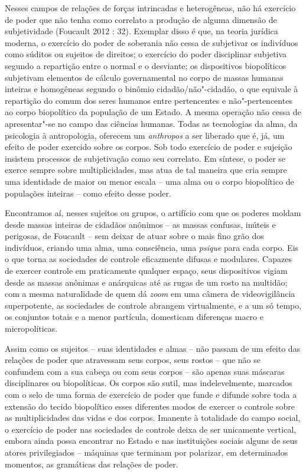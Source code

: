 Nesses campos de relações de forças intrincadas e heterogêneas, não há
exercício de poder que não tenha como correlato a produção de alguma
dimensão de subjetividade (Foucault 2012 : 32). Exemplar disso é que, na
teoria jurídica moderna, o exercício do poder de soberania não cessa de
subjetivar os indivíduos como súditos ou sujeitos de direitos; o
exercício do poder disciplinar subjetiva segundo a repartição entre o
normal e o desviante; os dispositivos biopolíticos subjetivam elementos
de cálculo governamental no corpo de massas humanas inteiras e
homogêneas segundo o binômio cidadão/não"-cidadão, o que equivale à
repartição do comum dos seres humanos entre pertencentes e
não"-pertencentes ao corpo biopolítico da população de um Estado. A mesma
operação não cessa de apresentar"-se no campo das ciências humanas. Todas
as tecnologias da alma, da psicologia à antropologia, oferecem um
\emph{anthropos} a ser liberado que é, já, um efeito de poder exercido
sobre os corpos. Sob todo exercício de poder e sujeição insistem
processos de subjetivação como seu correlato. Em síntese, o poder se
exerce sempre sobre multiplicidades, mas atua de tal maneira que cria
sempre uma identidade de maior ou menor escala -- uma alma ou o corpo
biopolítico de populações inteiras -- como efeito desse poder.

Encontramos aí, nesses sujeitos ou grupos, o artifício com que os
poderes moldam desde massas inteiras de cidadãos anônimos -- as massas
confusas, inúteis e perigosas, de Foucault -- sem deixar de atuar sobre
o mais fino grão dos indivíduos, criando uma alma, uma consciência, uma
\emph{psique} para cada corpo. Eis o que torna as sociedades de controle
eficazmente difusas e modulares. Capazes de exercer controle em
praticamente qualquer espaço, seus dispositivos vigiam desde as massas
anônimas e anárquicas até as rugas de um rosto na multidão; com a mesma
naturalidade de quem dá \emph{zoom} em uma câmera de videovigilância
superpotente, as sociedades de controle abrangem virtualmente, e a um só
tempo, os conjuntos totais e a menor partícula, domesticam diferenças
macro e micropolíticas.

Assim como os sujeitos -- suas identidades e almas -- não passam de um
efeito das relações de poder que atravessam seus corpos, seus rostos --
que não se confundem com a sua cabeça ou com seus corpos -- são apenas
suas máscaras disciplinares ou biopolíticas. Os corpos são sutil, mas
indelevelmente, marcados com o selo de uma forma de exercício de poder
que funde e difunde sobre toda a extensão do tecido biopolítico esses
diferentes modos de exercer o controle sobre as multiplicidades das
vidas e dos corpos. Imanente à totalidade do campo social, o exercício
de poder nas sociedades de controle deixa de ser unicamente vertical,
embora ainda possa encontrar no Estado e nas instituições sociais alguns
de seus atores privilegiados -- máquinas que terminam por polarizar, em
determinados momentos, as gramáticas das relações de poder.

